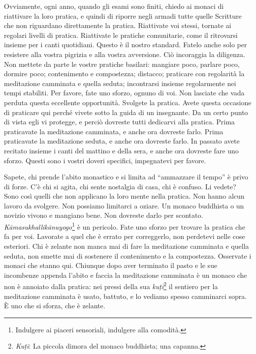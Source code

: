 Ovviamente, ogni anno, quando gli esami sono finiti, chiedo ai monaci di
riattivare la loro pratica, e quindi di riporre negli armadi tutte
quelle Scritture che non riguardano direttamente la pratica. Riattivate
voi stessi, tornate ai regolari livelli di pratica. Riattivate le
pratiche comunitarie, come il ritrovarsi insieme per i canti quotidiani.
Questo è il nostro standard. Fatelo anche solo per resistere alla vostra
pigrizia e alla vostra avversione. Ciò incoraggia la diligenza. Non
mettete da parte le vostre pratiche basilari: mangiare poco, parlare
poco, dormire poco; contenimento e compostezza; distacco; praticare con
regolarità la meditazione camminata e quella seduta; incontrarsi insieme
regolarmente nei tempi stabiliti. Per favore, fate uno sforzo, ognuno di
voi. Non lasciate che vada perduta questa eccellente opportunità.
Svolgete la pratica. Avete questa occasione di praticare qui perché
vivete sotto la guida di un insegnante. Da un certo punto di vista egli
vi protegge, e perciò dovreste tutti dedicarvi alla pratica. Prima
praticavate la meditazione camminata, e anche ora dovreste farlo. Prima
praticavate la meditazione seduta, e anche ora dovreste farlo. In
passato avete recitato insieme i canti del mattino e della sera, e anche
ora dovreste fare uno sforzo. Questi sono i vostri doveri specifici,
impegnatevi per favore.

Sapete, chi prende l'abito monastico e si limita ad ``ammazzare il
tempo'' è privo di forze. C'è chi si agita, chi sente nostalgia di casa,
chi è confuso. Li vedete? Sono così quelli che non applicano la loro
mente nella pratica. Non hanno alcun lavoro da svolgere. Non possiamo
limitarci a oziare. Un monaco buddhista o un novizio vivono e mangiano
bene. Non dovreste darlo per scontato.
\emph{Kāmasukhallikānuyogo}\footnote{Indulgere ai piaceri sensoriali,
  indulgere alla comodità.} è un pericolo. Fate uno sforzo per trovare
la pratica che fa per voi. Lavorate a quel che è errato per correggerlo,
non perdetevi nelle cose esteriori. Chi è zelante non manca mai di fare
la meditazione camminata e quella seduta, non smette mai di sostenere il
contenimento e la compostezza. Osservate i monaci che stanno qui.
Chiunque dopo aver terminato il pasto e le sue incombenze appenda
l'abito e faccia la meditazione camminata è un monaco che non è annoiato
dalla pratica: nei pressi della sua
\emph{kuṭī}\footnote{\emph{Kuṭī}: La piccola dimora
  del monaco buddhista; una capanna.} il sentiero per la meditazione
camminata è usato, battuto, e lo vediamo spesso camminarci sopra. È uno
che si sforza, che è zelante.

